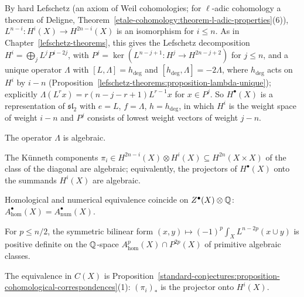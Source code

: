 By hard Lefschetz (an axiom of Weil cohomologies; for $\ell$-adic cohomology a theorem of Deligne, Theorem~\ref{etale-cohomology:theorem-l-adic-properties}(6)), $L^{n-i} \colon H^i(X) \to H^{2n-i}(X)$ is an
isomorphism for $i \leq n$. As in Chapter~\ref{lefschetz-theorems}, this gives the Lefschetz decomposition $H^i = \bigoplus_jL^jP^{i-2j}$, with $P^j = \ker(L^{n-j+1} \colon H^j \to H^{2n-j+2})$ for $j \leq n$, and a unique
operator $\Lambda$ with $[L, \Lambda] = h_{\deg}$ and $[h_{\deg}, \Lambda] = -2\Lambda$, where $h_{\deg}$ acts on $H^i$ by $i - n$ (Proposition~\ref{lefschetz-theorems:proposition-lambda-unique}); explicitly
$\Lambda(L^rx) = r(n - j - r + 1)L^{r-1}x$ for $x \in P^j$. So $H^\bullet(X)$ is a representation of $\mathfrak{sl}_2$ with $e = L$, $f = \Lambda$, $h = h_{\deg}$, in which $H^i$ is the weight space of weight $i - n$ and
$P^j$ consists of lowest weight vectors of weight $j - n$.

\begin{conjecture}\label{standard-conjectures:conjecture-b}
The operator $\Lambda$ is algebraic.
\end{conjecture}

\begin{conjecture}\label{standard-conjectures:conjecture-c}
The K\"unneth components $\pi_i \in H^{2n-i}(X) \otimes H^i(X) \subseteq H^{2n}(X \times X)$ of the class of the diagonal are algebraic; equivalently, the projectors of $H^\bullet(X)$ onto the summands $H^i(X)$
are algebraic.
\end{conjecture}

\begin{conjecture}\label{standard-conjectures:conjecture-d}
Homological and numerical equivalence coincide on $Z^\bullet(X) \otimes \mathbb{Q}$: $A^\bullet_{\mathrm{hom}}(X) = A^\bullet_{\mathrm{num}}(X)$.
\end{conjecture}

\begin{conjecture}\label{standard-conjectures:conjecture-hdg}
For $p \leq n/2$, the symmetric bilinear form $(x, y) \mapsto (-1)^p\int_XL^{n-2p}(x \cup y)$ is positive definite on the $\mathbb{Q}$-space $A^p_{\mathrm{hom}}(X) \cap P^{2p}(X)$ of primitive algebraic classes.
\end{conjecture}

The equivalence in $C(X)$ is Proposition~\ref{standard-conjectures:proposition-cohomological-correspondences}(1): $(\pi_i)_*$ is the projector onto $H^i(X)$.

